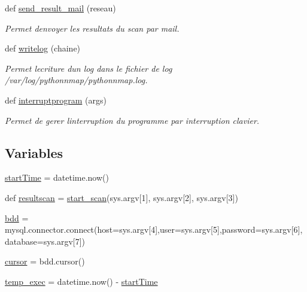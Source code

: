 \begin{DoxyCompactItemize}
def \hyperlink{namespacescan__without__thread_adc66d25732d159cb57f0e3aaf5e71e50}{send\+\_\+result\+\_\+mail} (reseau)
\begin{DoxyCompactList}\small\item\em Permet d\textquotesingle{}envoyer les resultats du scan par mail. \end{DoxyCompactList}\item 
def \hyperlink{namespacescan__without__thread_a5a6064958e2382403a126c34ce1c8f2e}{writelog} (chaine)
\begin{DoxyCompactList}\small\item\em Permet l\textquotesingle{}ecriture d\textquotesingle{}un log dans le fichier de log /var/log/pythonnmap/pythonnmap.log. \end{DoxyCompactList}\item 
def \hyperlink{namespacescan__without__thread_a7a72b363a60f185f533a648d7f6b00e3}{interruptprogram} (args)
\begin{DoxyCompactList}\small\item\em Permet de gerer l\textquotesingle{}interruption du programme par interruption clavier. \end{DoxyCompactList}\end{DoxyCompactItemize}
\subsection*{Variables}
\begin{DoxyCompactItemize}
\item 
\hyperlink{namespacescan__without__thread_a777417d808abe7a59485924efc125501}{start\+Time} = datetime.\+now()
\item 
def \hyperlink{namespacescan__without__thread_a8caf30dc0a87aa0836fe5b0491f45cbb}{resultscan} = \hyperlink{namespacescan__without__thread_a1085b956f7408fe1a9b3ff54fbc66984}{start\+\_\+scan}(sys.\+argv\mbox{[}1\mbox{]}, sys.\+argv\mbox{[}2\mbox{]}, sys.\+argv\mbox{[}3\mbox{]})
\item 
\hyperlink{namespacescan__without__thread_a0ff689283457b0b6f98fb047fe65e3f9}{bdd} = mysql.\+connector.\+connect(host=sys.\+argv\mbox{[}4\mbox{]},user=sys.\+argv\mbox{[}5\mbox{]},password=sys.\+argv\mbox{[}6\mbox{]}, database=sys.\+argv\mbox{[}7\mbox{]})
\item 
\hyperlink{namespacescan__without__thread_ab96035c23ecba59ad9570c46c57b7aa0}{cursor} = bdd.\+cursor()
\item 
\hyperlink{namespacescan__without__thread_a78dcee96ba66fb7d209f376b8455cbf9}{temp\+\_\+exec} = datetime.\+now() -\/ \hyperlink{namespacescan__without__thread_a777417d808abe7a59485924efc125501}{start\+Time}
\end{DoxyCompactItemize}



